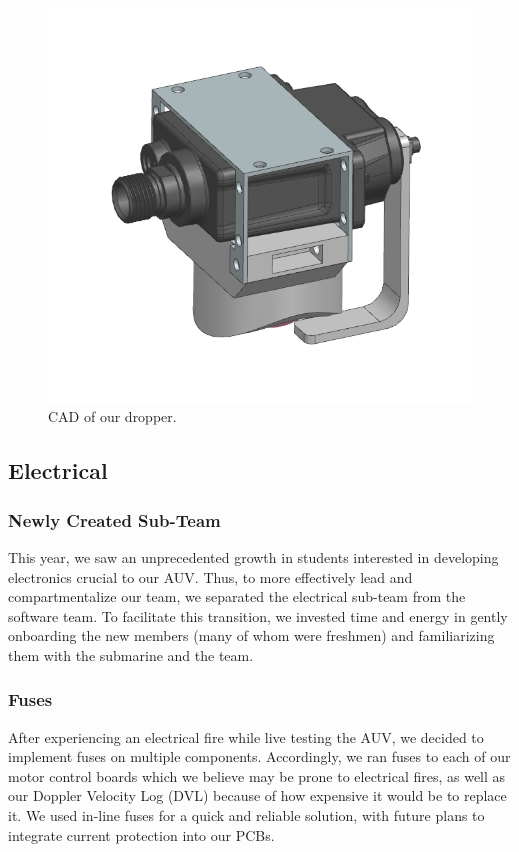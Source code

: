 \documentclass[conference]{IEEEtran}
\begin{document}
\begin{figure}
    \centerline{\includegraphics[scale=0.22]{images/dropperNew.png}}
    \caption{CAD of our dropper.}
    \label{fig:dropper}
\end{figure}

\subsection{Electrical}
\label{ssec:electrical}

\subsubsection{Newly Created Sub-Team}
\label{sssec:electrical_subteam}
This year, we saw an unprecedented growth in students interested in developing electronics crucial to our AUV. Thus, to more effectively lead and compartmentalize our team, we separated the electrical sub-team from the software team. To facilitate this transition, we invested time and energy in gently onboarding the new members (many of whom were freshmen) and familiarizing them with the submarine and the team.

\subsubsection{Fuses}
\label{sssec:fuses}
After experiencing an electrical fire while live testing the AUV, we decided to implement fuses on multiple components. Accordingly, we ran fuses to each of our motor control boards which we believe may be prone to electrical fires, as well as our Doppler Velocity Log (DVL) because of how expensive it would be to replace it. We used in-line fuses for a quick and reliable solution, with future plans to integrate current protection into our PCBs. 
\end{document}

